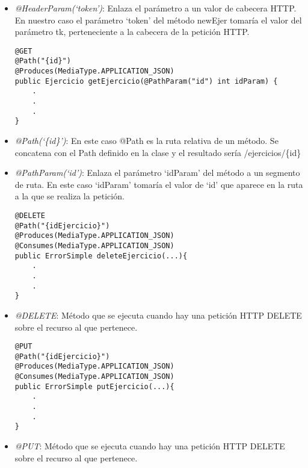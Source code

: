 \begin{itemize}
\item \textit{@HeaderParam(`token')}: Enlaza el parámetro a un valor de cabecera HTTP. En nuestro caso el parámetro `token' del método newEjer tomaría el valor del parámetro tk, perteneciente a la cabecera de la petición HTTP.


\vspace{1em}
{\codesize
\lstset{}
\begin{lstlisting}[frame=single]
@GET
@Path("{id}")
@Produces(MediaType.APPLICATION_JSON)
public Ejercicio getEjercicio(@PathParam("id") int idParam) {        
	.
	.
	.
}
\end{lstlisting}
}
\vspace{1em}

\item \textit{@Path(`\{id\}')}: En este caso @Path es la ruta relativa de un método. Se concatena con el Path definido en la clase y el resultado sería /ejercicios/\{id\}
\item \textit{@PathParam(`id')}: Enlaza el parámetro `idParam' del método a un segmento de ruta. En este caso `idParam' tomaría el valor de `id' que aparece en la ruta a la que se realiza la petición.


\vspace{1em}
{\codesize
\lstset{}
\begin{lstlisting}[frame=single]
@DELETE
@Path("{idEjercicio}")
@Produces(MediaType.APPLICATION_JSON)
@Consumes(MediaType.APPLICATION_JSON)
public ErrorSimple deleteEjercicio(...){
	.
	.
	.
}
\end{lstlisting}
}
\vspace{1em}

\item \textit{@DELETE}: Método que se ejecuta cuando hay una petición HTTP DELETE sobre el recurso al que pertenece.


\vspace{1em}
{\codesize
\lstset{}
\begin{lstlisting}[frame=single]
@PUT
@Path("{idEjercicio}")
@Produces(MediaType.APPLICATION_JSON)
@Consumes(MediaType.APPLICATION_JSON)
public ErrorSimple putEjercicio(...){
	.
	.
	.
}
\end{lstlisting}
}
\vspace{1em}

\item \textit{@PUT}: Método que se ejecuta cuando hay una petición HTTP DELETE sobre el recurso al que pertenece.

\end{itemize}

